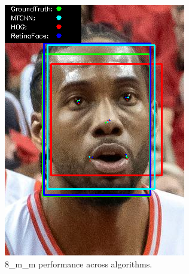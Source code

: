 \documentclass{l4proj}
\begin{document}
\begin{appendices}
\begin{figure}[h!]
  \centering
  \begin{minipage}{0.49\textwidth}
    \centering
     \includegraphics[width=\textwidth]{images/appendix/8.png}
    \caption{8\_m\_m performance across algorithms.}
    \label{whoopi_result}
  \end{minipage}
    \hfill
    \begin{minipage}{0.49\textwidth}
    \centering

\end{minipage}
\end{figure}
\end{appendices}
\end{document}
